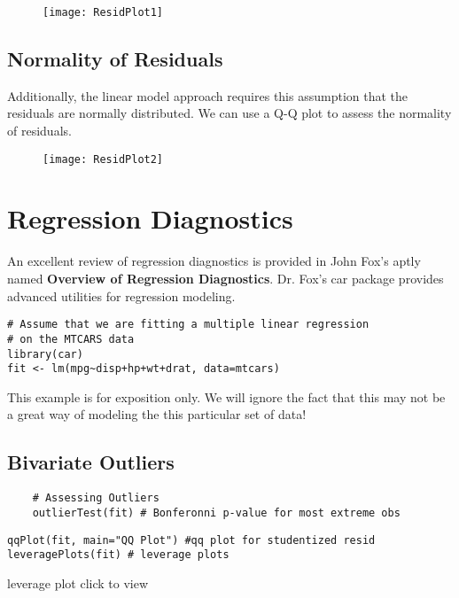 \begin{figure}
\centering
\texttt{[image: ResidPlot1]}
\end{figure}

\subsection{Normality of Residuals}
Additionally, the linear model approach requires this assumption that the residuals are normally
distributed. We can use a Q-Q plot to assess the normality of residuals.
\begin{figure}
\centering
\texttt{[image: ResidPlot2]}
\end{figure}

\newpage
\section{Regression Diagnostics}

An excellent review of regression diagnostics is provided in John Fox's aptly named \textbf{Overview of Regression Diagnostics}. Dr. Fox's car package provides advanced utilities for regression modeling.
\begin{framed}
	\begin{verbatim}
# Assume that we are fitting a multiple linear regression
# on the MTCARS data
library(car)
fit <- lm(mpg~disp+hp+wt+drat, data=mtcars)
	\end{verbatim}
\end{framed}

This example is for exposition only. 
We will ignore the fact that this may not be a great way of modeling the this particular set of data!

\subsection{Bivariate Outliers}

\begin{framed}
	\begin{verbatim}
	# Assessing Outliers
	outlierTest(fit) # Bonferonni p-value for most extreme obs

	\end{verbatim}
\end{framed}
\begin{framed}
	\begin{verbatim}
qqPlot(fit, main="QQ Plot") #qq plot for studentized resid 
leveragePlots(fit) # leverage plots
	\end{verbatim}
\end{framed}
leverage plot click to view

